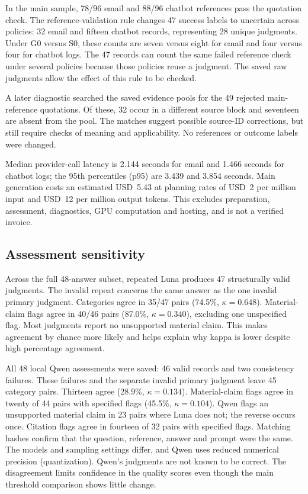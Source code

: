 \documentclass[a4paper,10pt,twocolumn]{article}
\begin{document}
In the main sample, 78/96 email and 88/96 chatbot references pass the quotation check. The reference-validation rule changes 47 success labels to uncertain across policies: 32 email and fifteen chatbot records, representing 28 unique judgments. Under G0 versus S0, these counts are seven versus eight for email and four versus four for chatbot logs. The 47 records can count the same failed reference check under several policies because those policies reuse a judgment. The saved raw judgments allow the effect of this rule to be checked.

A later diagnostic searched the saved evidence pools for the 49 rejected main-reference quotations. Of these, 32 occur in a different source block and seventeen are absent from the pool. The matches suggest possible source-ID corrections, but still require checks of meaning and applicability. No references or outcome labels were changed.

Median provider-call latency is 2.144 seconds for email and 1.466 seconds for chatbot logs; the 95th percentiles (p95) are 3.439 and 3.854 seconds. Main generation costs an estimated USD~5.43 at planning rates of USD~2 per million input and USD~12 per million output tokens. This excludes preparation, assessment, diagnostics, GPU computation and hosting, and is not a verified invoice.

\subsection{Assessment sensitivity}
Across the full 48-answer subset, repeated Luna produces 47 structurally valid judgments. The invalid repeat concerns the same answer as the one invalid primary judgment. Categories agree in 35/47 pairs (74.5\%, $\kappa=0.648$). Material-claim flags agree in 40/46 pairs (87.0\%, $\kappa=0.340$), excluding one unspecified flag. Most judgments report no unsupported material claim. This makes agreement by chance more likely and helps explain why kappa is lower despite high percentage agreement.

All 48 local Qwen assessments were saved: 46 valid records and two consistency failures. These failures and the separate invalid primary judgment leave 45 category pairs. Thirteen agree (28.9\%, $\kappa=0.134$). Material-claim flags agree in twenty of 44 pairs with specified flags (45.5\%, $\kappa=0.104$). Qwen flags an unsupported material claim in 23 pairs where Luna does not; the reverse occurs once. Citation flags agree in fourteen of 32 pairs with specified flags. Matching hashes confirm that the question, reference, answer and prompt were the same. The models and sampling settings differ, and Qwen uses reduced numerical precision (quantization). Qwen's judgments are not known to be correct. The disagreement limits confidence in the quality scores even though the main threshold comparison shows little change.
\end{document}

